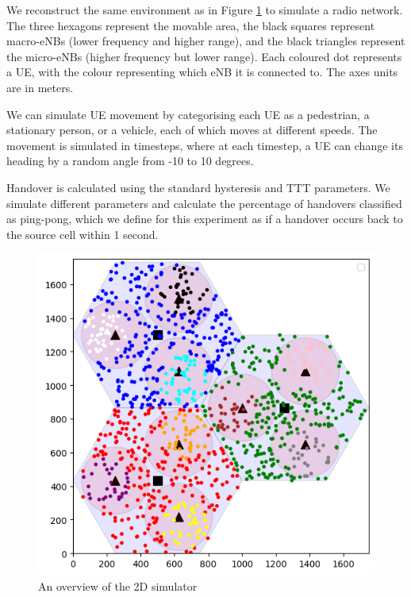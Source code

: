 We reconstruct the same environment as \citet{hatipoglu_handover-based_2020} in Figure \ref{fig:methods:grouped-uesim} to simulate a radio network. The three hexagons represent the movable area, the black squares represent macro-eNBs (lower frequency and higher range), and the black triangles represent the micro-eNBs (higher frequency but lower range). Each coloured dot represents a UE, with the colour representing which eNB it is connected to. The axes units are in meters.

We can simulate UE movement by categorising each UE as a pedestrian, a stationary person, or a vehicle, each of which moves at different speeds. The movement is simulated in timesteps, where at each timestep, a UE can change its heading by a random angle from -10 to 10 degrees.

Handover is calculated using the standard hysteresis and TTT parameters. We simulate different parameters and calculate the percentage of handovers classified as ping-pong, which we define for this experiment as if a handover occurs back to the source cell within 1 second.

\begin{figure}
    \centering
    \includegraphics[width=0.75\linewidth]{src//img/grouped_uesim.png}
    \caption{An overview of the 2D simulator}
    \label{fig:methods:grouped-uesim}
\end{figure}
